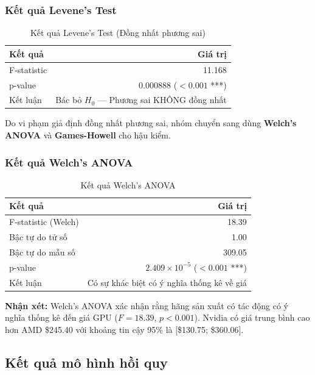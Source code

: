 \documentclass[a4paper]{article}
\begin{document}
\subsubsection{Kết quả Levene's Test}

\begin{table}[h!]
\centering
\caption{Kết quả Levene's Test (Đồng nhất phương sai)}
\begin{tabular}{|l|r|}
\hline
\textbf{Kết quả} & \textbf{Giá trị} \\
\hline
F-statistic & 11.168 \\
p-value & 0.000888 ($< 0.001$ ***) \\
Kết luận & Bác bỏ $H_0$ --- Phương sai KHÔNG đồng nhất \\
\hline
\end{tabular}
\end{table}

Do vi phạm giả định đồng nhất phương sai, nhóm chuyển sang dùng \textbf{Welch's ANOVA} và \textbf{Games-Howell} cho hậu kiểm.

\subsubsection{Kết quả Welch's ANOVA}

\begin{table}[h!]
\centering
\caption{Kết quả Welch's ANOVA}
\begin{tabular}{|l|r|}
\hline
\textbf{Kết quả} & \textbf{Giá trị} \\
\hline
F-statistic (Welch) & 18.39 \\
Bậc tự do tử số & 1.00 \\
Bậc tự do mẫu số & 309.05 \\
p-value & $2.409 \times 10^{-5}$ ($< 0.001$ ***) \\
Kết luận & Có sự khác biệt có ý nghĩa thống kê về giá \\
\hline
\end{tabular}
\end{table}

\textbf{Nhận xét:} Welch's ANOVA xác nhận rằng hãng sản xuất có tác động có ý nghĩa thống kê đến giá GPU ($F = 18.39$, $p < 0.001$). Nvidia có giá trung bình cao hơn AMD \$245.40 với khoảng tin cậy 95\% là [\$130.75; \$360.06].

\subsection{Kết quả mô hình hồi quy}
\end{document}

